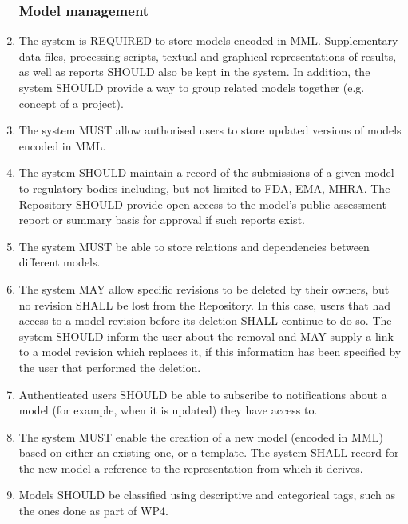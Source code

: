 \begin{enumerate}[1]
\subsubsection{Model management}
\item The system is REQUIRED to store models encoded in \gls{MML}. Supplementary data files, processing scripts, textual and graphical representations of results, as well as reports SHOULD also be kept in the system. In addition, the system SHOULD provide a way to group related models together (e.g. concept of a project).

\item The system MUST allow authorised users to store updated versions of models encoded in MML.

\item The system SHOULD maintain a record of the submissions of a given model to regulatory bodies including, but not limited to FDA, EMA, MHRA. The Repository SHOULD provide open access to the model's public assessment report or summary basis for approval if such reports exist. 

\item The system MUST be able to store relations and dependencies between different models.

\item The system MAY allow specific \glspl{revision} to be deleted by their owners, but no revision SHALL be lost from the Repository. In this case, users that had access to a model revision before its deletion SHALL continue to do so. The system SHOULD inform the user about the removal and MAY supply a link to a model revision which replaces it, if this information has been specified by the user that performed the deletion. 

\item Authenticated users SHOULD be able to subscribe to notifications about a model (for example, when it is updated) they have access to.

\item The system MUST enable the creation of a new model (encoded in MML) based on either an existing one, or a template. The system SHALL record for the new model a reference  to the representation from which it derives.

\item Models SHOULD be classified using descriptive and categorical tags, such as the ones done as part of WP4.


\end{enumerate}
